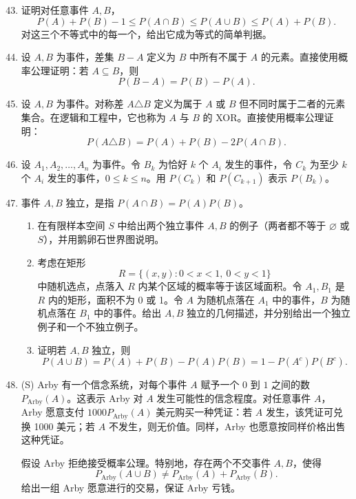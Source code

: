 \documentclass[UTF8, 12pt, fontset=fandol, oneside]{ctexart}
\begin{document}
\begin{enumerate}
  \setcounter{enumi}{42}
  \item 证明对任意事件 $A,B$，
  \[
    P(A)+P(B)-1\le P(A\cap B)\le P(A\cup B)\le P(A)+P(B).
  \]
  对这三个不等式中的每一个，给出它成为等式的简单判据。

  \item 设 $A,B$ 为事件，差集 $B-A$ 定义为 $B$ 中所有不属于 $A$ 的元素。直接使用概率公理证明：若 $A\subseteq B$，则
  \[
    P(B-A)=P(B)-P(A).
  \]

  \item 设 $A,B$ 为事件。对称差 $A\triangle B$ 定义为属于 $A$ 或 $B$ 但不同时属于二者的元素集合。在逻辑和工程中，它也称为 $A$ 与 $B$ 的 XOR。直接使用概率公理证明：
  \[
    P(A\triangle B)=P(A)+P(B)-2P(A\cap B).
  \]

  \item 设 $A_1,A_2,\ldots,A_n$ 为事件。令 $B_k$ 为恰好 $k$ 个 $A_i$ 发生的事件，令 $C_k$ 为至少 $k$ 个 $A_i$ 发生的事件，$0\le k\le n$。用 $P(C_k)$ 和 $P(C_{k+1})$ 表示 $P(B_k)$。

  \item 事件 $A,B$ 独立，是指 $P(A\cap B)=P(A)P(B)$。
  \begin{enumerate}
    \item 在有限样本空间 $S$ 中给出两个独立事件 $A,B$ 的例子（两者都不等于 $\varnothing$ 或 $S$），并用鹅卵石世界图说明。
    \item 考虑在矩形
    \[
      R=\{(x,y):0<x<1,\ 0<y<1\}
    \]
    中随机选点，点落入 $R$ 内某个区域的概率等于该区域面积。令 $A_1,B_1$ 是 $R$ 内的矩形，面积不为 0 或 1。令 $A$ 为随机点落在 $A_1$ 中的事件，$B$ 为随机点落在 $B_1$ 中的事件。给出 $A,B$ 独立的几何描述，并分别给出一个独立例子和一个不独立例子。
    \item 证明若 $A,B$ 独立，则
    \[
      P(A\cup B)=P(A)+P(B)-P(A)P(B)=1-P(A^c)P(B^c).
    \]
  \end{enumerate}

  \item (S) Arby 有一个信念系统，对每个事件 $A$ 赋予一个 $0$ 到 $1$ 之间的数 $P_{\text{Arby}}(A)$。这表示 Arby 对 $A$ 发生可能性的信念程度。对任意事件 $A$，Arby 愿意支付 $1000P_{\text{Arby}}(A)$ 美元购买一种凭证：若 $A$ 发生，该凭证可兑换 1000 美元；若 $A$ 不发生，则无价值。同样，Arby 也愿意按同样价格出售这种凭证。

  假设 Arby 拒绝接受概率公理。特别地，存在两个不交事件 $A,B$，使得
  \[
    P_{\text{Arby}}(A\cup B)\ne P_{\text{Arby}}(A)+P_{\text{Arby}}(B).
  \]
  给出一组 Arby 愿意进行的交易，保证 Arby 亏钱。
\end{enumerate}
\end{document}
